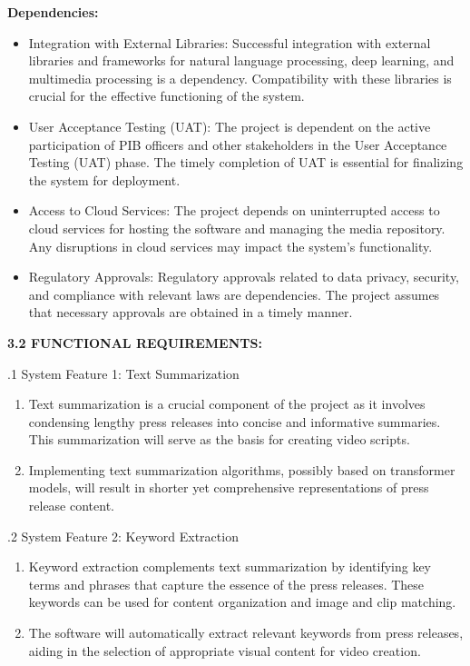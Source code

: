 \documentclass[12pt]{article}
\begin{document}
\textbf{Dependencies:}
\begin{itemize}
\item Integration with External Libraries:
Successful integration with external libraries and frameworks for natural language processing, deep learning, and multimedia processing is a dependency. Compatibility with these libraries is crucial for the effective functioning of the system.
\item User Acceptance Testing (UAT):
The project is dependent on the active participation of PIB officers and other stakeholders in the User Acceptance Testing (UAT) phase. The timely completion of UAT is essential for finalizing the system for deployment.
\item Access to Cloud Services:
The project depends on uninterrupted access to cloud services for hosting the software and managing the media repository. Any disruptions in cloud services may impact the system's functionality.
\item Regulatory Approvals:
Regulatory approvals related to data privacy, security, and compliance with relevant laws are dependencies. The project assumes that necessary approvals are obtained in a timely manner.
\end{itemize}

\bigskip

\justify \fontsize{12}{12}\textbf{3.2 FUNCTIONAL REQUIREMENTS:}

.1 System Feature 1: Text Summarization

\begin{enumerate}
\def\labelenumi{\arabic{enumi}.}
\item
  Text summarization is a crucial component of the project as it
  involves condensing lengthy press releases into concise and informative summaries. 
  This summarization will serve as the basis for creating video scripts.

\item
  Implementing text summarization algorithms, possibly based on transformer models, will result in shorter yet comprehensive representations of press release content.
\end{enumerate}
\pagebreak{}

.2 System Feature 2: Keyword Extraction

\begin{enumerate}
\def\labelenumi{\arabic{enumi}.}
\item
  Keyword extraction complements text summarization by identifying key terms and phrases that capture the essence of the press releases. These keywords can be used for content organization and image and clip matching.
\item
  The software will automatically extract relevant keywords from press releases, aiding in the selection of appropriate visual content for video creation.
\end{enumerate}
\end{document}
